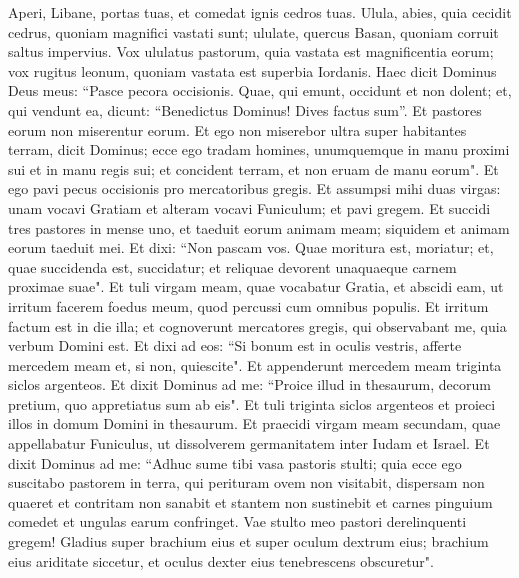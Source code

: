 \begin{biblechapter}  
\verse Aperi, Libane, portas tuas, et comedat ignis cedros tuas. 
\verse Ulula, abies, quia cecidit cedrus, quoniam magnifici vastati sunt; ululate, quercus Basan, quoniam corruit saltus impervius. 
\verse Vox ululatus pastorum, quia vastata est magnificentia eorum; vox rugitus leonum, quoniam vastata est superbia Iordanis. 
\verse Haec dicit Dominus Deus meus: “Pasce pecora occisionis. 
\verse Quae, qui emunt, occidunt et non dolent; et, qui vendunt ea, dicunt: “Benedictus Dominus! Dives factus sum”. Et pastores eorum non miserentur eorum. 
\verse Et ego non miserebor ultra super habitantes terram, dicit Dominus; ecce ego tradam homines, unumquemque in manu proximi sui et in manu regis sui; et concident terram, et non eruam de manu eorum". 
\verse Et ego pavi pecus occisionis pro mercatoribus gregis. Et assumpsi mihi duas virgas: unam vocavi Gratiam et alteram vocavi Funiculum; et pavi gregem. 
\verse Et succidi tres pastores in mense uno, et taeduit eorum animam meam; siquidem et animam eorum taeduit mei. 
\verse Et dixi: “Non pascam vos. Quae moritura est, moriatur; et, quae succidenda est, succidatur; et reliquae devorent unaquaeque carnem proximae suae". 
\verse Et tuli virgam meam, quae vocabatur Gratia, et abscidi eam, ut irritum facerem foedus meum, quod percussi cum omnibus populis. 
\verse Et irritum factum est in die illa; et cognoverunt mercatores gregis, qui observabant me, quia verbum Domini est. 
\verse Et dixi ad eos: “Si bonum est in oculis vestris, afferte mercedem meam et, si non, quiescite". Et appenderunt mercedem meam triginta siclos argenteos. 
\verse Et dixit Dominus ad me: “Proice illud in thesaurum, decorum pretium, quo appretiatus sum ab eis". Et tuli triginta siclos argenteos et proieci illos in domum Domini in thesaurum. 
\verse Et praecidi virgam meam secundam, quae appellabatur Funiculus, ut dissolverem germanitatem inter Iudam et Israel. 
\verse Et dixit Dominus ad me: “Adhuc sume tibi vasa pastoris stulti; 
\verse quia ecce ego suscitabo pastorem in terra, qui perituram ovem non visitabit, dispersam non quaeret et contritam non sanabit et stantem non sustinebit et carnes pinguium comedet et ungulas earum confringet. 
\verse Vae stulto meo pastori derelinquenti gregem! Gladius super brachium eius et super oculum dextrum eius; brachium eius ariditate siccetur, et oculus dexter eius tenebrescens obscuretur". 
\end{biblechapter}

